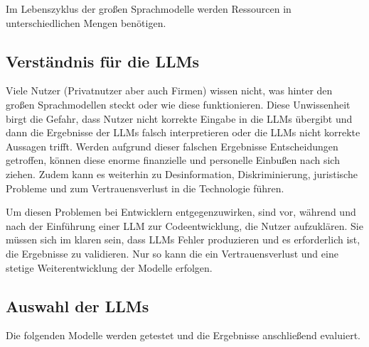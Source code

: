Im Lebenszyklus der großen Sprachmodelle werden Ressourcen in unterschiedlichen Mengen benötigen.\vspace{0.2cm}



\subsection{Verständnis für die LLMs}
Viele Nutzer (Privatnutzer aber auch Firmen) wissen nicht, was hinter den großen Sprachmodellen steckt oder wie diese funktionieren. Diese Unwissenheit birgt die Gefahr, dass Nutzer nicht korrekte Eingabe in die LLMs übergibt und dann die Ergebnisse der LLMs falsch interpretieren oder die LLMs nicht korrekte Aussagen trifft. Werden aufgrund dieser falschen Ergebnisse Entscheidungen getroffen, können diese enorme finanzielle und personelle Einbußen nach sich ziehen. Zudem kann es weiterhin zu Desinformation, Diskriminierung, juristische Probleme und zum Vertrauensverlust in die Technologie führen.\vspace{0.2cm}

Um diesen Problemen bei Entwicklern entgegenzuwirken, sind vor, während und nach der Einführung einer LLM zur Codeentwicklung, die Nutzer aufzuklären. Sie müssen sich im klaren sein, dass LLMs Fehler produzieren und es erforderlich ist, die Ergebnisse zu validieren. Nur so kann die ein Vertrauensverlust und eine stetige Weiterentwicklung der Modelle erfolgen.



\subsection{Auswahl der LLMs}
Die folgenden Modelle werden getestet und die Ergebnisse anschließend evaluiert.

